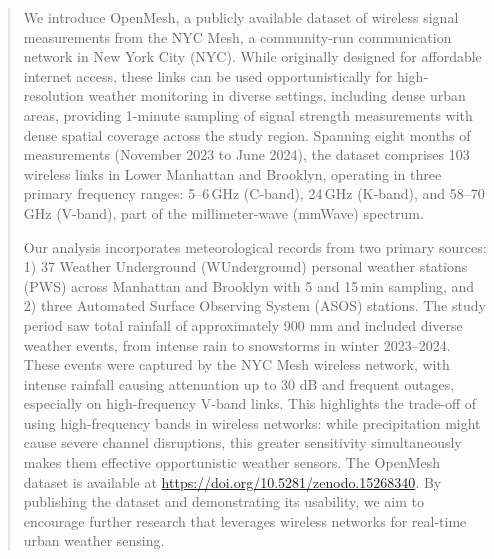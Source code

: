 \documentclass[manuscript]{copernicus}
\begin{document}
\begin{abstract}
We introduce OpenMesh, a publicly available dataset of wireless signal measurements from the NYC Mesh, a community-run communication network in New York City (NYC). While originally designed for affordable internet access, these links can be used opportunistically for high-resolution weather monitoring in diverse settings, including dense urban areas, providing 1-minute sampling of signal strength measurements with dense spatial coverage across the study region.
Spanning eight months of measurements (November 2023 to June 2024), the dataset comprises 103 wireless links in Lower Manhattan and Brooklyn, operating in three primary frequency ranges: 5--6\,GHz (C-band), 24\,GHz (K-band), and 58--70\,GHz (V-band), part of the millimeter-wave (mmWave) spectrum.

Our analysis incorporates meteorological records from two primary sources: 1) 37 Weather Underground (WUnderground) personal weather stations (PWS) across Manhattan and Brooklyn with 5 and 15\,min sampling, and 2) three Automated Surface Observing System (ASOS) stations.
The study period saw total rainfall of approximately 900 mm and included diverse weather events, from intense rain to snowstorms in winter 2023--2024. These events were captured by the NYC Mesh wireless network, with intense rainfall causing attenuation up to 30 dB and frequent outages, especially on high-frequency V-band links. This highlights the trade-off of using high-frequency bands in wireless networks: while precipitation might cause severe channel disruptions, this greater sensitivity simultaneously makes them effective opportunistic weather sensors.
The OpenMesh dataset is available at \url{https://doi.org/10.5281/zenodo.15268340}\citep{Jacoby2025OpenMesh}.
By publishing the dataset and demonstrating its usability, we aim to encourage further research that leverages wireless networks for real-time urban weather sensing.
\end{abstract}

\end{document}
